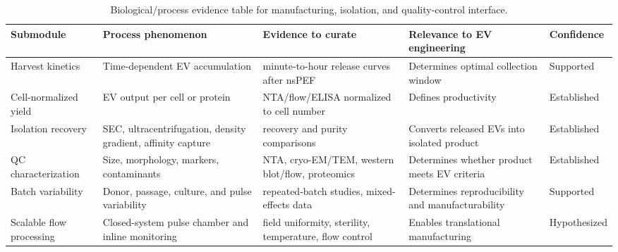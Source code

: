 \begin{table}[t]
\footnotesize\sf
\centering
\caption{Biological/process evidence table for manufacturing, isolation, and quality-control interface.\label{T_A15_bio_manufacturing}}
\begin{tabular}{p{2.7cm} p{3.4cm} p{4.2cm} p{3.0cm} p{2.0cm}}
\toprule
\textbf{Submodule} & \textbf{Process phenomenon} & \textbf{Evidence to curate} & \textbf{Relevance to EV engineering} & \textbf{Confidence} \\
\midrule
Harvest kinetics & Time-dependent EV accumulation & minute-to-hour release curves after nsPEF & Determines optimal collection window & Supported \cite{orlacchio2023effects,gudvangen2022electroporation,mendt2018generation} \\
Cell-normalized yield & EV output per cell or protein & NTA/flow/ELISA normalized to cell number & Defines productivity & Established \cite{welsh2024minimal,paganini2019scalable,mendt2018generation} \\
Isolation recovery & SEC, ultracentrifugation, density gradient, affinity capture & recovery and purity comparisons & Converts released EVs into isolated product & Established \cite{watson2018scalable,brennan2020comparison,webber2013pure} \\
QC characterization & Size, morphology, markers, contaminants & NTA, cryo-EM/TEM, western blot/flow, proteomics & Determines whether product meets EV criteria & Established \cite{welsh2024minimal,jeppesen2019reassessment,kugeratski2021quantitative} \\
Batch variability & Donor, passage, culture, and pulse variability & repeated-batch studies, mixed-effects data & Determines reproducibility and manufacturability & Supported \cite{paganini2019scalable,watson2018scalable,mendt2018generation,thakur2024global} \\
Scalable flow processing & Closed-system pulse chamber and inline monitoring & field uniformity, sterility, temperature, flow control & Enables translational manufacturing & Hypothesized \cite{liu2026microfluidic,garcia2016microfluidic,bonakdar2017microfluidic,thakur2024global} \\
\bottomrule
\end{tabular}
\end{table}


